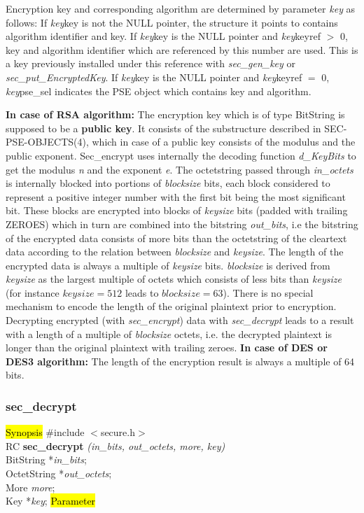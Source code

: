 Encryption key and corresponding algorithm are determined by parameter {\em key} as follows:
\be
\m If {\em key}\pf key is not the NULL pointer, the structure it points to
   contains algorithm identifier and key.
\m If {\em key}\pf key is the NULL pointer and {\em key}\pf keyref $>$ 0,
   key and algorithm identifier which are referenced by this number are used. This is a key
   previously installed under this reference with {\em sec\_gen\_key} or 
   {\em sec\_put\_EncryptedKey}.
\m If {\em key}\pf key is the NULL pointer and {\em key}\pf keyref $=$ 0,
   {\em key}\pf pse\_sel indicates the PSE object which contains key and algorithm.
\ee

{\bf In case of RSA algorithm:}
\be
\m The encryption key which is of type BitString is supposed to be
   a {\bf public key}. It consists of the substructure described in
   SEC-PSE-OBJECTS(4), which in case of a public key consists of the
   modulus and the public exponent. Sec\_encrypt uses internally the
   decoding function {\em d\_KeyBits} to get the modulus {\em n} and the exponent {\em e}.
\m The octetstring passed through {\em in\_octets} is internally blocked into portions of
   {\em blocksize} bits, each block considered to represent a positive integer number with the first bit
   being the most significant bit. These blocks are encrypted into blocks of {\em keysize} bits
   (padded with trailing ZEROES) which in turn are combined into the bitstring {\em out\_bits}, i.e
   the bitstring of the encrypted data consists of more bits than the octetstring of the cleartext data
   according to the relation between {\em blocksize} and {\em keysize}. 
   The length of the encrypted data is always a multiple of {\em keysize} bits. 
   {\em blocksize} is derived from {\em keysize} as the largest multiple of octets which consists of
   less bits than {\em keysize} (for instance $keysize = 512$ leads to $blocksize = 63$).
\m There is no special mechanism to encode the length of the original plaintext prior
   to encryption. Decrypting encrypted (with {\em sec\_encrypt}) data with {\em sec\_decrypt}
   leads to a result with a length of a multiple of {\em blocksize} octets, i.e. the decrypted
   plaintext is longer than the original plaintext with trailing zeroes.
\ee
{\bf In case of DES or DES3 algorithm:}
   The length of the encryption result is always a multiple of 64 bits.


\subsubsection{sec\_decrypt}
\label{sec_decrypt}
\hl{Synopsis}
\#include $<$secure.h$>$ \\ [0.5cm]
RC {\bf sec\_decrypt} {\em (in\_bits, out\_octets, more, key)} \\
BitString *{\em in\_bits}; \\
OctetString *{\em out\_octets}; \\
More {\em more}; \\
Key *{\em key};
\hl{Parameter}

